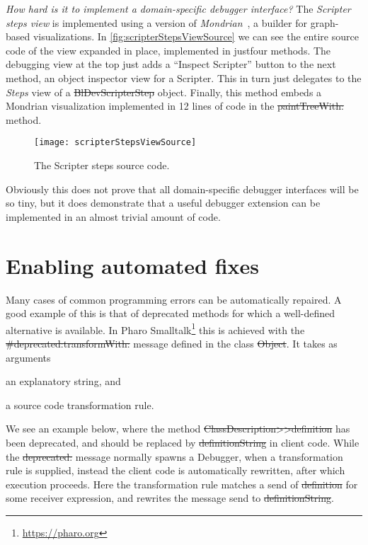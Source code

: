 \documentclass[sigplan,anonymous,review,10pt]{acmart}
\begin{document}
\emph{How hard is it to implement a domain-specific debugger interface?}
The \emph{Scripter steps view} is implemented using a version of \emph{Mondrian}~\cite{Pena13b,Meye06a}, a builder for graph-based visualizations.
In \autoref{fig:scripterStepsViewSource} we can see the entire source code of the view expanded in place, implemented in justfour methods.
The debugging view at the top just adds a ``Inspect Scripter'' button to the next method, an object inspector view for a Scripter.
This in turn just delegates to the \emph{Steps} view of a \st{BlDevScripterStep} object.
Finally, this method embeds a Mondrian visualization implemented in 12 lines of code in the \st{paintTreeWith:} method.


\begin{figure}[h]
  \texttt{[image: scripterStepsViewSource]}
  \caption{The Scripter steps source code.}
  \label{fig:scripterStepsViewSource}
\end{figure}

Obviously this does not prove that all domain-specific debugger interfaces will be so tiny, but it does demonstrate that a useful debugger extension can be implemented in an almost trivial amount of code.

\section{Enabling automated fixes}\label{sec:fixes}

Many cases of common programming errors can be automatically repaired.
A good example of this is that of deprecated methods for which a well-defined alternative is available.
In Pharo Smalltalk\footnote{\url{https://pharo.org}} this is achieved with the \st{#deprecated:transformWith:} message defined in the class \st{Object}.
It takes as arguments
\begin{inparaenum}[(i)]
	\item an explanatory string, and
	\item a source code transformation rule.
\end{inparaenum}    
We see an example below, where the method \st{ClassDescription>>definition} has been deprecated, and should be replaced by \st{definitionString} in client code.
While the \st{deprecated:} message normally spawns a Debugger, when a transformation rule is supplied, instead the client code is automatically rewritten, after which execution proceeds.
Here the transformation rule matches a send of \st{definition} for some receiver expression, and rewrites the message send to \st{definitionString}.
\end{document}
